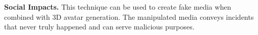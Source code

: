 \documentclass[10pt,twocolumn,letterpaper]{article}
\begin{document}
\noindent\textbf{Social Impacts.} This technique can be used to create fake media when combined with 3D avatar generation. The manipulated media conveys incidents that never truly happened and can serve malicious purposes.

 



\clearpage
{\small


}
\end{document}
